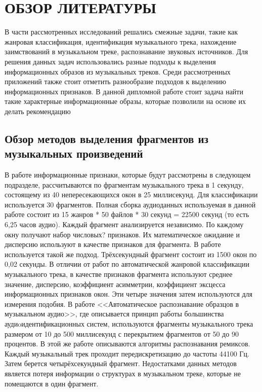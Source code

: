 \section{ОБЗОР ЛИТЕРАТУРЫ}
\label{sec:domain}
В части рассмотренных исследований решались смежные задачи, такие как жанровая классификация, идентификация музыкального трека, нахождение заимствований в музыкальном треке, распознавание  звуковых источников. Для решения данных задач использовались разные подходы к выделения информационных образов из музыкальных треков. Среди рассмотренных приложений также стоит отметить разнообразие подходов к выделению информационных признаков. В данной дипломной работе стоит задача найти такие характерные информационные образы, которые позволили на основе их делать рекомендацию
\subsection{Обзор методов выделения фрагментов из музыкальных произведений}
\label{sub:domain:overview_framing}
В работе\cite{src1}  информационные признаки, которые будут рассмотрены в следующем подразделе,  рассчитываются по фрагментам музыкального трека в 1 секунду, состоящему из 40 непересекающихся окон в  25 миллисекунд.  Для классификации используется 30 фрагментов. Полная сборка аудиоданных используемая в данной работе  состоит из 15 жанров * 50 файлов * 30 секунд = 22500 секунд (то есть 6,25 часов аудио). Каждый фрагмент  анализируется независимо. По каждому окну получают набор числовых? признаков. Их математическое ожидание и дисперсию используют в качестве признаков для фрагмента. В работе\cite{src2} используется такой же подход. Трёхсекундный фрагмент состоит из 1500 окон по 0,02 секунды. В отличии от работ\cite{src1} по автоматической жанровой классификации музыкального трека, в качестве признаков фрагмента используют  среднее значение, дисперсию, коэффициент асимметрии, коэффициент эксцесса информационных признаков окон. Эти четыре значения затем используются для измерения подобия. В работе\cite{src4}  <<Автоматическое распознавание образцов в музыкальном аудио>>, где описывается принцип работы большинства аудиoидентификационных систем, используются фрагменты музыкального трека размером от 10 до 500 миллисекунд с перекрытием фрагментов от 50 до 90 процентов. В этой же работе описываются алгоритмы распознавания ремиксов. Каждый музыкальный трек проходит передискретизацию до частоты 44100 Гц. Затем берется  четырёхсекундный фрагмент.
Недостатками данных методов является потеря информации о структурах в музыкальном треке, которые не помещаются в один фрагмент.

